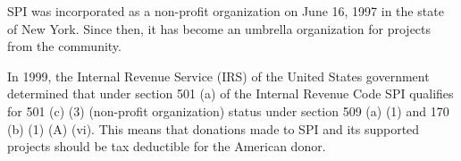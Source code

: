 \documentclass[letterpaper]{report}
\begin{document}
SPI was incorporated as a non-profit organization on June 16, 1997 in the state
of New York. Since then, it has become an umbrella organization for projects
from the community.

In 1999, the Internal Revenue Service (IRS) of the United States government
determined that under section 501 (a) of the Internal Revenue Code SPI
qualifies for 501 (c) (3) (non-profit organization) status under section 509
(a) (1) and 170 (b) (1) (A) (vi). This means that donations made to SPI and its
supported projects should be tax deductible for the American donor.
\end{document}
